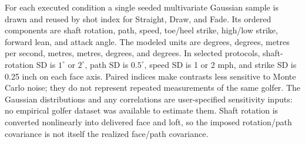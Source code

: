 \documentclass[11pt,letterpaper]{article}
\begin{document}
For each executed condition a single seeded multivariate Gaussian sample is
drawn and reused by shot index for Straight, Draw, and Fade. Its ordered
components are shaft rotation, path, speed, toe/heel strike, high/low strike,
forward lean, and attack angle. The modeled units are degrees, degrees,
metres per second, metres, metres, degrees, and degrees. In selected protocols,
shaft-rotation SD is $1^\circ$ or $2^\circ$, path SD is $0.5^\circ$, speed SD
is 1 or 2 mph, and strike SD is 0.25 inch on each face axis. Paired indices
make contrasts less sensitive to Monte Carlo noise; they do not represent
repeated measurements of the same golfer. The Gaussian distributions and any
correlations are user-specified sensitivity inputs: no empirical golfer
dataset was available to estimate them. Shaft rotation is converted
nonlinearly into delivered face and loft, so the imposed rotation/path
covariance is not itself the realized face/path covariance.
\end{document}
